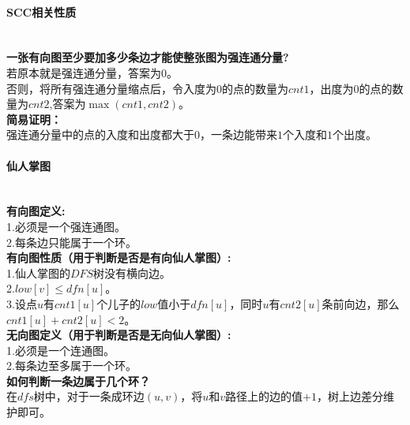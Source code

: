 \paragraph{SCC相关性质}~{}
\\
\textbf{一张有向图至少要加多少条边才能使整张图为强连通分量?}\\
若原本就是强连通分量，答案为$0$。\\
否则，将所有强连通分量缩点后，令入度为$0$的点的数量为$cnt1$，出度为$0$的点的数量为$cnt2$,答案为$\max(cnt1, cnt2)$。\\
\textbf{简易证明：}\\
强连通分量中的点的入度和出度都大于$0$，一条边能带来$1$个入度和$1$个出度。\\

\paragraph{仙人掌图}~{}
\\
\textbf{有向图定义:}\\
1.必须是一个强连通图。\\
2.每条边只能属于一个环。\\
\textbf{有向图性质（用于判断是否是有向仙人掌图）:}\\
1.仙人掌图的$DFS$树没有横向边。\\
2.$low[v] \leq dfn[u]$。\\
3.设点$u$有$cnt1[u]$个儿子的$low$值小于$dfn[u]$，同时$u$有$cnt2[u]$条前向边，那么$cnt1[u]+cnt2[u]<2$。\\
\textbf{无向图定义（用于判断是否是无向仙人掌图）:}\\
1.必须是一个连通图。\\
2.每条边至多属于一个环。\\
\textbf{如何判断一条边属于几个环？}\\
在$dfs$树中，对于一条成环边$(u, v)$，将$u$和$v$路径上的边的值$+1$，树上边差分维护即可。